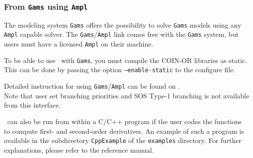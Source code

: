 \subsubsection{From {\tt Gams} using {\tt Ampl}}
The modeling system {\tt Gams} offers the possibility to solve {\tt Gams} models using any
{\tt Ampl} capable solver. The {\tt Gams}/{\tt Ampl} link comes free with the {\tt Gams}
system, but users must have a licensed {\tt Ampl} on their machine.

To be able to use \Bonmin\ with {\tt Gams}, you must compile the COIN-OR libraries as static.
This can be done by passing the option {\tt --enable-static} to the configure file.

Detailed instruction for using {\tt Gams}/{\tt Ampl} can be found
on .\\

Note that user set branching priorities and SOS Type-1 branching is not
available from this interface.

\Bonmin\ can also be run from within a C/C++ program if the user codes
the functions to compute first- and second-order derivatives.
An example of such a program is available in the subdirectory {\tt CppExample} of
the {\tt examples} directory. For further explanations, please refer to the reference manual.
